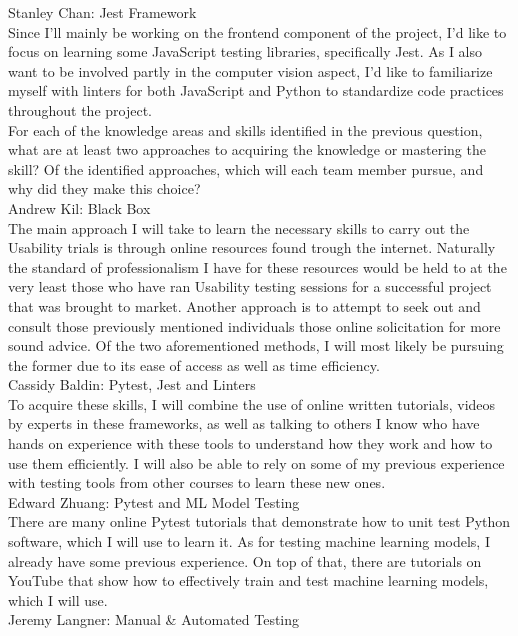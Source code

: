 \documentclass[12pt, titlepage]{article}
\begin{document}
\begin{outline}[enumerate]
    \2 Stanley Chan: Jest Framework \\
    Since I'll mainly be working on the frontend component of the project, I'd like to focus on learning some JavaScript testing libraries, specifically Jest. As I also want to be involved partly in the computer vision aspect, I'd like to familiarize myself with linters for both JavaScript and Python to standardize code practices throughout the project.\\
  \1 For each of the knowledge areas and skills identified in the previous
  question, what are at least two approaches to acquiring the knowledge or
  mastering the skill?  Of the identified approaches, which will each team
  member pursue, and why did they make this choice?\\
    \2 Andrew Kil: Black Box\\
    The main approach I will take to learn the necessary skills to carry out the Usability trials is through online resources found trough the internet. Naturally the standard of professionalism I have for these resources would be held to at the very least those who have ran Usability testing sessions for a successful project that was brought to market. Another approach is to attempt to seek out and consult those previously mentioned individuals those online solicitation for more sound advice. Of the two aforementioned methods, I will most likely be pursuing the former due to its ease of access as well as time efficiency.\\
    \2 Cassidy Baldin: Pytest, Jest and Linters\\
    To acquire these skills, I will combine the use of online written tutorials, videos by experts in these frameworks, as well as talking to others I know who have hands on experience with these tools to understand how they work and how to use them efficiently. I will also be able to rely on some of my previous experience with testing tools from other courses to learn these new ones.\\
    \2 Edward Zhuang: Pytest and ML Model Testing\\
	  There are many online Pytest tutorials that demonstrate how to unit test Python software, which I will use to learn it. As for testing machine learning models, I already have some previous experience. On top of that, there are tutorials on YouTube that show how to effectively train and test machine learning models, which I will use.\\
    \2 Jeremy Langner: Manual \& Automated Testing\\

\end{outline}
\end{document}
